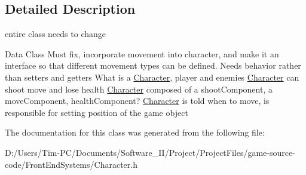 \subsection{Detailed Description}
entire class needs to change 

Data Class Must fix, incorporate movement into character, and make it an interface so that different movement types can be defined. Needs behavior rather than setters and getters What is a \hyperlink{class_character}{Character}, player and enemies \hyperlink{class_character}{Character} can shoot move and lose health \hyperlink{class_character}{Character} composed of a shoot\+Component, a move\+Component, health\+Component? \hyperlink{class_character}{Character} is told when to move, is responsible for setting position of the game object 

The documentation for this class was generated from the following file\+:\begin{DoxyCompactItemize}
\item 
D\+:/\+Users/\+Tim-\/\+P\+C/\+Documents/\+Software\+\_\+\+I\+I/\+Project/\+Project\+Files/game-\/source-\/code/\+Front\+End\+Systems/Character.\+h\end{DoxyCompactItemize}
